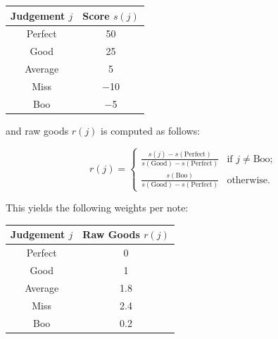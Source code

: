 \begin{center}
	\begin{tabular}{c@{\hskip 10mm}c}
		\hspace{5mm} \textbf{Judgement} $j$ \hspace{5mm} & \textbf{Score} $s(j)$ \\
		\hline
		
		Perfect                               & 50                    \\
		Good                                  & 25                    \\
		Average                               & 5                     \\
		Miss                                  & $-$10                 \\
		Boo                                   & $-$5                  \\
	\end{tabular}
\end{center}

and raw goods $r(j)$ is computed as follows:

\begin{equation*}
	r(j) = 
	\begin{cases}
		\displaystyle \frac{s(j) - s(\text{Perfect})}{s(\text{Good}) - s(\text{Perfect})}
		  &   
		\text{if $j \neq \text{Boo}$;}
		\\[10pt]
		\displaystyle \frac{s(\text{Boo})}{s(\text{Good}) - s(\text{Perfect})}
		  &   
		\text{otherwise.}
	\end{cases}
\end{equation*}

This yields the following weights per note:

\begin{center}
	\begin{tabular}{c@{\hskip 5mm}c}
		\hspace{5mm} \textbf{Judgement} $j$ \hspace{5mm} & \textbf{Raw Goods} $r(j)$ \\
            \hline
		Perfect                               & 0                         \\
		Good                                  & 1                         \\
		Average                               & 1.8                       \\
		Miss                                  & 2.4                       \\
		Boo                                   & 0.2                       \\
	\end{tabular}
\end{center}

